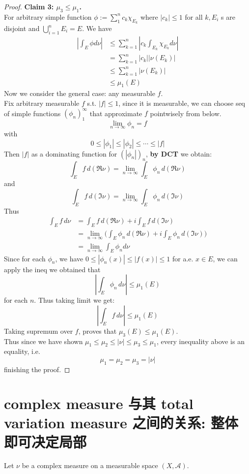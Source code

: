 \documentclass[lang=cn,11pt]{elegantbook}
\begin{document}
\begin{proof}
\textbf{Claim 3: $\mu_3 \leq \mu_1$.}\\
For arbitrary simple function $\phi:=\sum_1^n c_k \chi_{E_k}$ where $\left|c_k\right| \leq 1$ for all $k, E_i$ s are disjoint and $\bigcup_{i=1}^n E_i=E$. We have\begin{align*}
    \left|\int_E \phi d \nu\right| &\leq \sum_{k=1}^n\left|c_k \int_{E_k} \chi_{E_k} d \nu\right|\\
    &=\sum_{k=1}^n\left|c_k\right|\left|\nu\left(E_k\right)\right| \\
    &\leq \sum_{k=1}^n\left|\nu\left(E_k\right)\right| \\
    &\leq \mu_1(E)
\end{align*}
Now we consider the general case: any measurable $f$.\\
Fix arbitrary measurable $f$ s.t. $|f| \leq 1$, since it is measurable, we can choose seq of simple functions  $(\phi_n)_1^\infty$ that approximate $f$ pointwisely from below.\\
\[
\lim_{n\to \infty} \phi_n   = f
\]with \[
  0\leq |\phi_1 |\leq |\phi_2| \leq \cdots \leq | f| 
\]
Then $|f|$ as a dominating function for $( |\phi_n|)_n$, \textbf{by DCT }we obtain: \[
\int_E f \, d (\Re \nu) = \lim_{n\to \infty} \int_E \phi_n \, d (\Re \nu) 
\]
and \[
\int_E f \, d (\Im \nu) =  \lim_{n\to \infty} \int_E \phi_n \, d (\Im \nu) 
\]
Thus
\begin{align*}
    \int_E f \, d\nu &= \int_E  f \, d(\Re \nu) + i\int_E  f \, d(\Im \nu)\\
    &= \lim_{n\to \infty} \bigg( \int_E \phi_n \, d (\Re \nu)  + i  \int_E \phi_n \, d (\Im \nu)  \bigg)\\
    & =  \lim_{n\to \infty} \int _E \phi_n d \nu
\end{align*}
Since for each $\phi_n$, we have $0 \leq |\phi_n(x)|  \leq |f(x)|\leq 1$ for a.e. $x\in E$, we can apply the ineq we obtained that \[  \left|\int_E \phi_n \, d \nu\right|   \leq  \mu_1(E)\] for each $n$. Thus taking limit we get: \[
        \left|\int_E f \, d \nu\right|   \leq  \mu_1(E) 
    \]
Taking supremum over $f$, proves that $\mu_3(E) \leq \mu_1(E)$. \\
Thus since we have shown $\mu_1 \leq \mu_2 \leq|\nu| \leq \mu_3 \leq \mu_1$, every inequality above is an equality, i.e.\[
\mu_1=\mu_2=\mu_3=|\nu|
\]finishing the proof.
\end{proof}






\section{complex measure 与其 total variation measure 之间的关系: 整体即可决定局部}
  Let $\nu$ be a complex measure on a measurable space $(X,\mathcal{A})$. 
\end{document}
